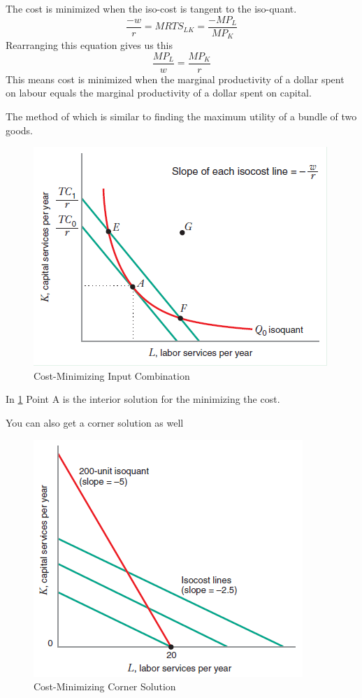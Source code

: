 \documentclass[../ECON-281-Notes.tex]{subfiles}
\begin{document}
The cost is minimized when the iso-cost is tangent to the iso-quant. 
\[
    \frac{-w}{r} = MRTS_{LK} = \frac{-MP_L}{MP_K}
\]
Rearranging this equation gives us this
\[
    \frac{MP_L}{w} = \frac{MP_K}{r}
\]
This means cost is minimized when the marginal productivity of a dollar spent on labour equals the marginal productivity of a dollar spent on capital. 

The method of which is similar to finding the maximum utility of a bundle of two goods. 

\begin{figure}[h]
    \centering
    \includegraphics[width=\columnwidth]{../assets/cost-minimizing-input.png}
    \caption{Cost-Minimizing Input Combination}
    \label{fig:cost_min_input}
\end{figure}
In \cref{fig:cost_min_input} Point A is the interior solution for the minimizing the cost.

You can also get a corner solution as well 
\begin{figure}[h]
    \centering
    \includegraphics[width=\columnwidth]{../assets/corner-soln-isocost.png}
    \caption{Cost-Minimizing Corner Solution}
    \label{fig:cost_min_corner}
\end{figure}
\end{document}
